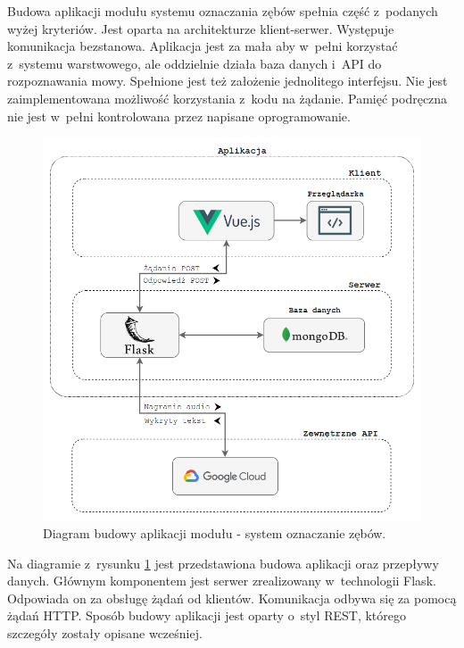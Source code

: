 Budowa aplikacji modułu systemu oznaczania zębów spełnia część z~podanych wyżej kryteriów. Jest oparta na architekturze klient-serwer. Występuje komunikacja bezstanowa. Aplikacja jest za mała aby w~pełni korzystać z~systemu warstwowego, ale oddzielnie działa baza danych i~API do rozpoznawania mowy. Spełnione jest też założenie jednolitego interfejsu. Nie jest zaimplementowana możliwość korzystania z~kodu na żądanie. Pamięć podręczna nie jest w~pełni kontrolowana przez napisane oprogramowanie. 


\begin{figure}[ht!]
\centering\includegraphics[width=140mm,scale=1.5]{figures/app.png}
\caption{Diagram budowy aplikacji modułu - system oznaczanie zębów.}
\label{fig:appArch}
\end{figure}

Na diagramie z~rysunku \ref{fig:appArch} jest przedstawiona budowa aplikacji oraz przepływy danych. Głównym komponentem jest serwer zrealizowany w~technologii Flask. Odpowiada on za obsługę żądań od klientów. Komunikacja odbywa się za pomocą żądań HTTP. Sposób budowy aplikacji jest oparty o~styl REST, którego szczegóły zostały opisane wcześniej.


